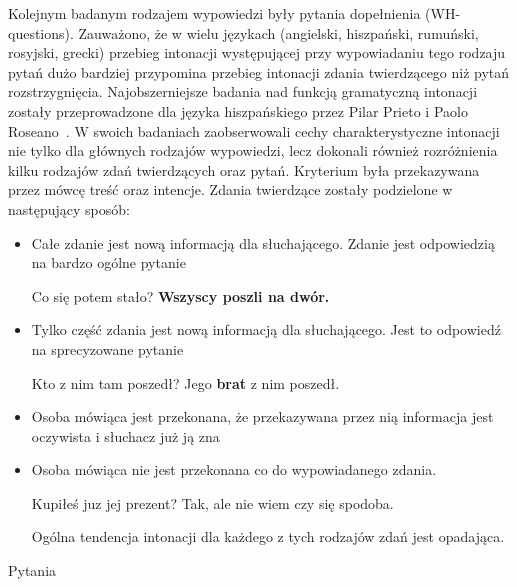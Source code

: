 \documentclass[a4paper,12 pt]{article}
\begin{document}
Kolejnym badanym rodzajem wypowiedzi były pytania dopełnienia (WH-questions). Zauważono, że w wielu językach (angielski, hiszpański, rumuński, rosyjski, grecki) przebieg intonacji występującej przy wypowiadaniu tego rodzaju pytań dużo bardziej przypomina przebieg intonacji zdania twierdzącego niż pytań rozstrzygnięcia.
\newline
\newline
Najobszerniejsze badania nad funkcją gramatyczną intonacji zostały przeprowadzone dla języka hiszpańskiego przez Pilar Prieto i Paolo Roseano~\cite{SPA}. W swoich badaniach zaobserwowali cechy charakterystyczne intonacji nie tylko dla głównych rodzajów wypowiedzi, lecz dokonali również rozróżnienia kilku rodzajów zdań twierdzących oraz pytań. Kryterium była przekazywana przez mówcę treść oraz intencje.
\newline
Zdania twierdzące zostały podzielone w następujący sposób:
\begin{itemize}
\item{Całe zdanie jest nową informacją dla słuchającego. Zdanie jest odpowiedzią na bardzo ogólne pytanie}
\begin{exe}
\ex Co się potem stało?
\newline
\textbf{Wszyscy poszli na dwór.}
\end{exe}
\item{Tylko część zdania jest nową informacją dla słuchającego. Jest to odpowiedź na sprecyzowane pytanie}
\begin{exe}
\ex Kto z nim tam poszedł?
\newline
Jego \textbf{brat} z nim poszedł.
\end{exe}

\item{Osoba mówiąca jest przekonana, że przekazywana przez nią informacja jest oczywista i słuchacz już ją zna}
\item{Osoba mówiąca nie jest przekonana co do wypowiadanego zdania.}
\begin{exe}
\ex Kupiłeś juz jej prezent?
\newline
Tak, ale nie wiem czy się spodoba.
\end{exe}
Ogólna tendencja intonacji dla każdego z tych rodzajów zdań jest opadająca.
\end{itemize}
Pytania
\end{document}
